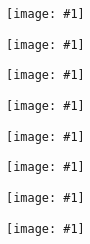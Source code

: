 \documentclass[english, 12 pt]{report}
\newcommand{\fig}[1]{
\begin{center}
		\texttt{[image: \#1]} \\[60pt]
\end{center} 
}
\begin{document}
\pagestyle{empty}

\fig{fig1}
\fig{fig2}
\fig{fig3}
\fig{fig4}
\fig{fig5}
\fig{fig6}
\fig{fig7}
\fig{fig8}
\end{document}
